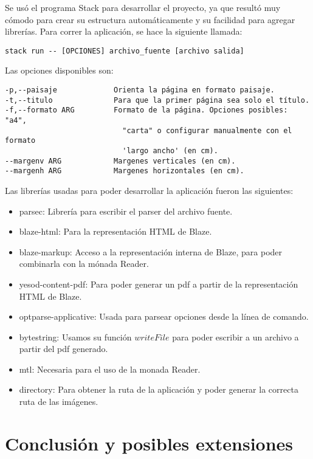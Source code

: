 \documentclass{article}
\begin{document}
Se usó el programa Stack para desarrollar el proyecto, ya que resultó muy cómodo para crear su estructura automáticamente y su facilidad para agregar librerías. Para correr la aplicación, se hace la siguiente llamada:
\begin{verbatim}
stack run -- [OPCIONES] archivo_fuente [archivo salida]
\end{verbatim}
Las opciones disponibles son:
\begin{verbatim}
-p,--paisaje             Orienta la página en formato paisaje.
-t,--titulo              Para que la primer página sea solo el título.
-f,--formato ARG         Formato de la página. Opciones posibles: "a4",
                           "carta" o configurar manualmente con el formato
                           'largo ancho' (en cm).
--margenv ARG            Margenes verticales (en cm).
--margenh ARG            Margenes horizontales (en cm).
\end{verbatim}
Las librerías usadas para poder desarrollar la aplicación fueron las siguientes:
\begin{itemize}
    \item parsec: Librería para escribir el parser del archivo fuente.
    \item blaze-html: Para la representación HTML de Blaze.
    \item blaze-markup: Acceso a la representación interna de Blaze, para poder combinarla con la mónada Reader.
    \item yesod-content-pdf: Para poder generar un pdf a partir de la representación HTML de Blaze.
    \item optparse-applicative: Usada para parsear opciones desde la línea de comando.
    \item bytestring: Usamos su función $writeFile$ para poder escribir a un archivo a partir del pdf generado.
    \item mtl: Necesaria para el uso de la monada Reader.
    \item directory: Para obtener la ruta de la aplicación y poder generar la correcta ruta de las imágenes.
\end{itemize}

\section{Conclusión y posibles extensiones}
\end{document}
